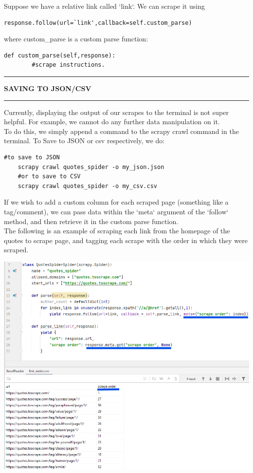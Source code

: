 \documentclass[8pt]{extarticle}
\newcommand{\heading}[1]{%
    \noindent
    \rule{\linewidth}{0.4pt}
    \begin{center}
        \vspace{-1ex}
        \textbf{#1}        
        \vspace{-2.5ex}
    \end{center}
    \rule{\linewidth}{0.4pt}
}
\begin{document}
\begin{multicols}{3}
Suppose we have a relative link called `link`. We can scrape it using 
\begin{lstlisting}[style=python]     
    response.follow(url=`link',callback=self.custom_parse)
\end{lstlisting}
where custom\_parse is a custom parse function:
\begin{lstlisting}[style=python]     
    def custom_parse(self,response):
        #scrape instructions.
\end{lstlisting}

\columnbreak
\heading{SAVING TO JSON/CSV}

Currently, displaying the output of our scrapes to the terminal is not super helpful. For example, we cannot do any further data manipulation on it. \\

To do this, we simply append a command to the scrapy crawl command in the terminal. To Save to JSON or csv respectively, we do:
\begin{lstlisting}[style=python]     
    #to save to JSON
    scrapy crawl quotes_spider -o my_json.json
    #or to save to CSV
    scrapy crawl quotes_spider -o my_csv.csv
\end{lstlisting}

If we wish to add a custom column for each scraped page (something like a tag/comment), we can pass data within the `meta` argument of the `follow` method, and then retrieve it in the custom parse function.\\

The following is an example of scraping each link from the homepage of the quotes to scrape page, and tagging each scrape with the order in which they were scraped. 

\begin{center}
    \includegraphics[width=\columnwidth]{images/meta_example.png}
\end{center}


\end{multicols}
\end{document}
